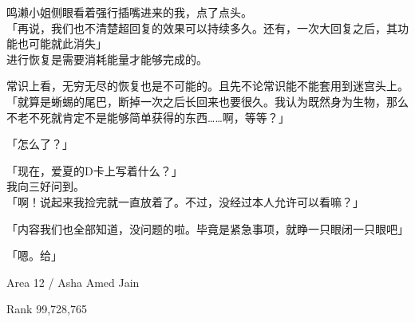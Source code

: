 鸣濑小姐侧眼看着强行插嘴进来的我，点了点头。\\

「再说，我们也不清楚超回复的效果可以持续多久。还有，一次大回复之后，其功能也可能就此消失」\\

进行恢复是需要消耗能量才能够完成的。

常识上看，无穷无尽的恢复也是不可能的。且先不论常识能不能套用到迷宫头上。\\

「就算是蜥蜴的尾巴，断掉一次之后长回来也要很久。我认为既然身为生物，那么不老不死就肯定不是能够简单获得的东西……啊，等等？」

「怎么了？」

「现在，爱夏的D卡上写着什么？」\\

我向三好问到。\\

「啊！说起来我捡完就一直放着了。不过，没经过本人允许可以看嘛？」

「内容我们也全部知道，没问题的啦。毕竟是紧急事项，就睁一只眼闭一只眼吧」

「嗯。给」\\

\cardline

  Area 12 / Asha Amed Jain

  Rank 99,728,765

%  


